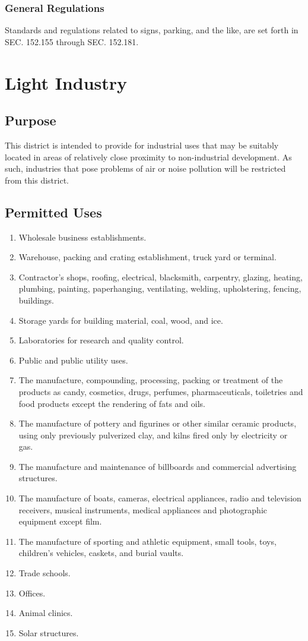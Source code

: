 \subsubsection{General Regulations}
Standards and regulations related to signs, parking, and the like, are set forth in SEC. 152.155 through SEC. 152.181.

\section{Light Industry}
\subsection{Purpose}
This district is intended to provide for industrial uses that may be suitably located in areas of relatively close proximity to non-industrial development. As such, industries that pose problems of air or noise pollution will be restricted from this district.
\subsection{Permitted Uses}
\begin{enumerate}[{\indent}1)]
    \item Wholesale business establishments.
    \item Warehouse, packing and crating establishment, truck yard or terminal.
    \item Contractor’s shops, roofing, electrical, blacksmith, carpentry, glazing, heating, plumbing, painting, paperhanging, ventilating, welding, upholstering, fencing, buildings.
    \item Storage yards for building material, coal, wood, and ice.
    \item Laboratories for research and quality control.
    \item Public and public utility uses.
    \item The manufacture, compounding, processing, packing or treatment of the products as candy, cosmetics, drugs, perfumes, pharmaceuticals, toiletries and food products except the rendering of fats and oils.
    \item The manufacture of pottery and figurines or other similar ceramic products, using only previously pulverized clay, and kilns fired only by electricity or gas.
    \item The manufacture and maintenance of billboards and commercial advertising structures.
    \item The manufacture of boats, cameras, electrical appliances, radio and television receivers, musical instruments, medical appliances and photographic equipment except film.
    \item The manufacture of sporting and athletic equipment, small tools, toys, children’s vehicles, caskets, and burial vaults.
    \item Trade schools.
    \item Offices.
    \item Animal clinics.
    \item Solar structures.
\end{enumerate}
